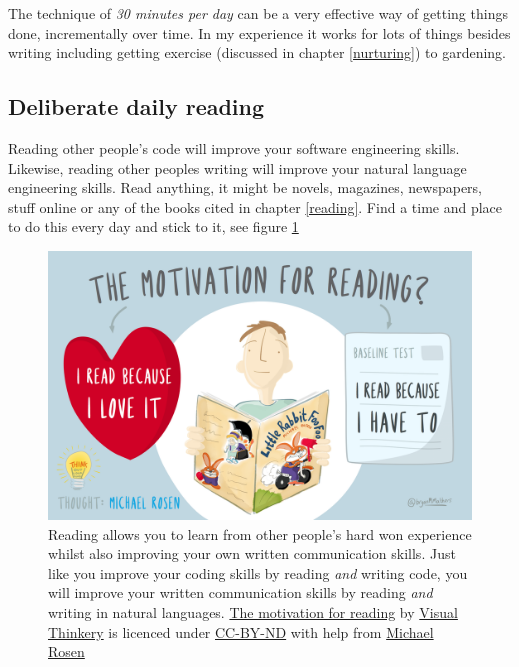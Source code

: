 \documentclass[
]{book}
\begin{document}
The technique of \emph{30 minutes per day} can be a very effective way of getting things done, incrementally over time. In my experience it works for lots of things besides writing including getting exercise (discussed in chapter \ref{nurturing}) to gardening. \citep{leendertz}

\hypertarget{dailyread}{%
\subsection{Deliberate daily reading}\label{dailyread}}

Reading other people's code will improve your software engineering skills. Likewise, reading other peoples writing will improve your natural language engineering skills. Read anything, it might be novels, magazines, newspapers, stuff online or any of the books cited in chapter \ref{reading}. Find a time and place to do this every day and stick to it, see figure \ref{fig:reading-fig}

\begin{figure}

{\centering \includegraphics[width=1\linewidth]{images/the-motivation-for-reading} 

}

\caption{Reading allows you to learn from other people's hard won experience whilst also improving your own written communication skills. Just like you improve your coding skills by reading \emph{and} writing code, you will improve your written communication skills by reading \emph{and} writing in natural languages. \href{https://bryanmmathers.com/the-motivation-for-reading/}{The motivation for reading} by \href{https://visualthinkery.com/}{Visual Thinkery} is licenced under \href{https://creativecommons.org/licenses/by-nd/4.0/}{CC-BY-ND} with help from \href{https://en.wikipedia.org/wiki/Michael_Rosen}{Michael Rosen}}\label{fig:reading-fig}
\end{figure}
\end{document}
